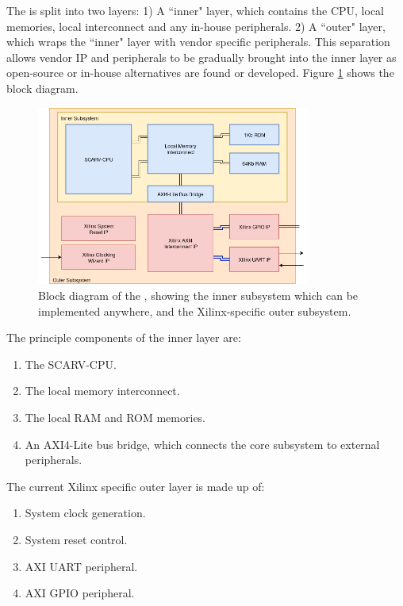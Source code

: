 
The \SCARVSOC is split into two layers:
1) A ``inner" layer, which contains the CPU, local memories, local
   interconnect and any in-house peripherals.
2) A ``outer" layer, which wraps the ``inner" layer with vendor specific
   peripherals.
This separation allows vendor IP and peripherals to be gradually brought
into the inner layer as open-source or in-house alternatives are
found or developed.
Figure \ref{fig:design:soc-blocks} shows the \SCARVSOC block diagram.

\begin{figure}
\centering
\includegraphics[width=0.8\textwidth]{image/soc-block-diagram.png}
\caption{
Block diagram of the \SCARVSOC, showing the inner subsystem which can be
implemented anywhere, and the Xilinx-specific outer subsystem.
}
\label{fig:design:soc-blocks}
\end{figure}

\noindent The principle components of the inner layer are:

\begin{enumerate}
\item The SCARV-CPU.
\item The local memory interconnect.
\item The local RAM and ROM memories.
\item An AXI4-Lite bus bridge, which connects the core subsystem to
      external peripherals.
\end{enumerate}


\noindent The current Xilinx specific outer layer is made up of:

\begin{enumerate}
\item System clock generation.
\item System reset control.
\item AXI UART peripheral.
\item AXI GPIO peripheral.
\end{enumerate}

